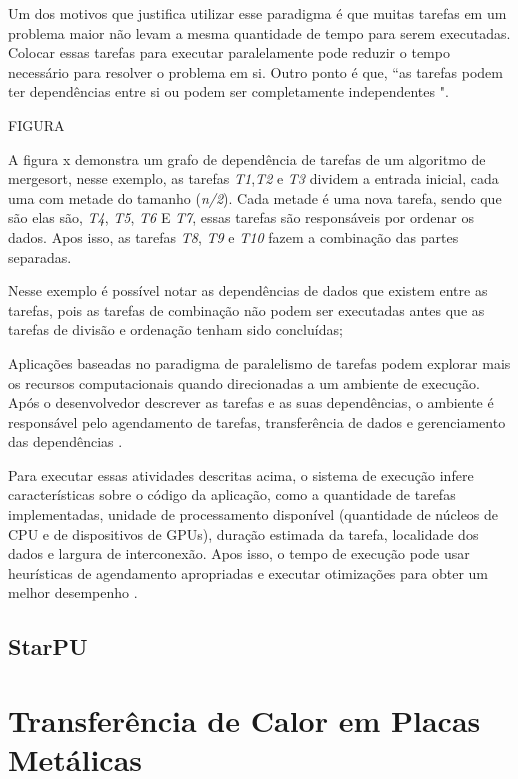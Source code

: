 Um dos motivos que justifica utilizar esse paradigma é que muitas tarefas em um problema maior não levam a mesma quantidade de tempo para serem executadas.
Colocar essas tarefas para executar paralelamente pode reduzir o tempo necessário para resolver o problema em si.
Outro ponto é que, “as tarefas podem ter dependências entre si ou podem ser completamente independentes \cite{pinto2013escalonamento}".

FIGURA

A figura x demonstra um grafo de dependência de tarefas de um algoritmo de mergesort, nesse exemplo, as tarefas \emph{T1},\emph{T2} e \emph{T3} dividem a entrada inicial, cada uma com metade do tamanho (\emph{n/2}).
Cada metade é uma nova tarefa, sendo que são elas são, \emph{T4}, \emph{T5}, \emph{T6} E \emph{T7}, essas tarefas são responsáveis por ordenar os dados.
Apos isso, as tarefas \emph{T8}, \emph{T9} e \emph{T10} fazem a combinação das partes separadas.

Nesse exemplo é possível notar as dependências de dados que existem entre as tarefas, pois as tarefas de combinação não podem ser executadas antes que as tarefas de divisão e ordenação tenham sido concluídas;

Aplicações baseadas no paradigma de paralelismo de tarefas podem explorar mais os recursos computacionais quando direcionadas a um ambiente de execução.
Após o desenvolvedor descrever as tarefas e as suas dependências, o ambiente é responsável pelo agendamento de tarefas, transferência de dados e gerenciamento das dependências \cite{pinto2017visual}.

Para executar essas atividades descritas acima, o sistema de execução infere características sobre o código da aplicação, como a quantidade de tarefas implementadas, unidade de processamento disponível (quantidade de núcleos de CPU e de dispositivos de GPUs), duração estimada da tarefa, localidade dos dados e largura de interconexão.
Apos isso, o tempo de execução pode usar heurísticas de agendamento apropriadas e executar otimizações para obter um melhor desempenho \cite{pinto2017visual}.

\subsection{StarPU}

\section{Transferência de Calor em Placas Metálicas}